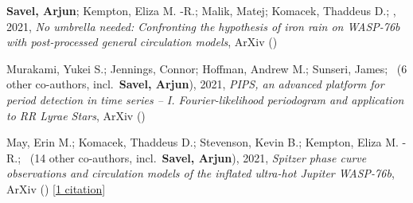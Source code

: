 \item[{\color{numcolor}\scriptsize3}] \textbf{Savel, Arjun}; Kempton, Eliza M. -R.; Malik, Matej; Komacek, Thaddeus D.; \etal, 2021, \emph{No umbrella needed: Confronting the hypothesis of iron rain on WASP-76b with post-processed general circulation models}, ArXiv ()

\item[{\color{numcolor}\scriptsize2}] Murakami, Yukei S.; Jennings, Connor; Hoffman, Andrew M.; Sunseri, James; \etal\ ({6} other co-authors, incl.\ \textbf{Savel, Arjun}), 2021, \emph{PIPS, an advanced platform for period detection in time series -- I. Fourier-likelihood periodogram and application to RR Lyrae Stars}, ArXiv ()

\item[{\color{numcolor}\scriptsize1}] May, Erin M.; Komacek, Thaddeus D.; Stevenson, Kevin B.; Kempton, Eliza M. -R.; \etal\ ({14} other co-authors, incl.\ \textbf{Savel, Arjun}), 2021, \emph{Spitzer phase curve observations and circulation models of the inflated ultra-hot Jupiter WASP-76b}, ArXiv () [\href{https://ui.adsabs.harvard.edu/abs/2021arXiv210703349M}{1 citation}]